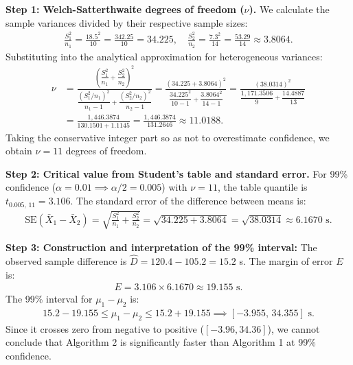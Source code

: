 \begin{solproblema}
	\textbf{Step 1: Welch-Satterthwaite degrees of freedom ($\nu$).}
	We calculate the sample variances divided by their respective sample sizes:
	\begin{align}
		\frac{S_1^2}{n_1} = \frac{18.5^2}{10} = \frac{342.25}{10} = 34.225, \quad \frac{S_2^2}{n_2} = \frac{7.3^2}{14} = \frac{53.29}{14} \approx 3.8064.
	\end{align}
	Substituting into the analytical approximation for heterogeneous variances:
	\begin{align}
		\nu &= \frac{\left( \dfrac{S_1^2}{n_1} + \dfrac{S_2^2}{n_2} \right)^2}{\dfrac{(S_1^2 / n_1)^2}{n_1 - 1} + \dfrac{(S_2^2 / n_2)^2}{n_2 - 1}} = \frac{(34.225 + 3.8064)^2}{\dfrac{34.225^2}{10 - 1} + \dfrac{3.8064^2}{14 - 1}} = \frac{(38.0314)^2}{\dfrac{1,171.3506}{9} + \dfrac{14.4887}{13}} \\
		&= \frac{1,446.3874}{130.1501 + 1.1145} = \frac{1,446.3874}{131.2646} \approx 11.0188.
	\end{align}
	Taking the conservative integer part so as not to overestimate confidence, we obtain $\nu = 11$ degrees of freedom.
	
	\textbf{Step 2: Critical value from Student's table and standard error.}
	For 99\% confidence ($\alpha = 0.01 \implies \alpha/2 = 0.005$) with $\nu = 11$, the table quantile is $t_{0.005, \, 11} = 3.106$.
	The standard error of the difference between means is:
	\begin{align}
		\text{SE}(\bar{X}_1 - \bar{X}_2) = \sqrt{\frac{S_1^2}{n_1} + \frac{S_2^2}{n_2}} = \sqrt{34.225 + 3.8064} = \sqrt{38.0314} \approx 6.1670 \text{ s.}
	\end{align}
	
	\textbf{Step 3: Construction and interpretation of the 99\% interval:}
	The observed sample difference is $\hat{D} = 120.4 - 105.2 = 15.2$ s. The margin of error $E$ is:
	\begin{align}
		E = 3.106 \times 6.1670 \approx 19.155 \text{ s.}
	\end{align}
	The 99\% interval for $\mu_1 - \mu_2$ is:
	\begin{align}
		15.2 - 19.155 \le \mu_1 - \mu_2 \le 15.2 + 19.155 \implies [-3.955, \, 34.355] \text{ s.}
	\end{align}
	Since it crosses zero from negative to positive ($[-3.96, 34.36]$), we cannot conclude that Algorithm 2 is significantly faster than Algorithm 1 at 99\% confidence.
\end{solproblema}

